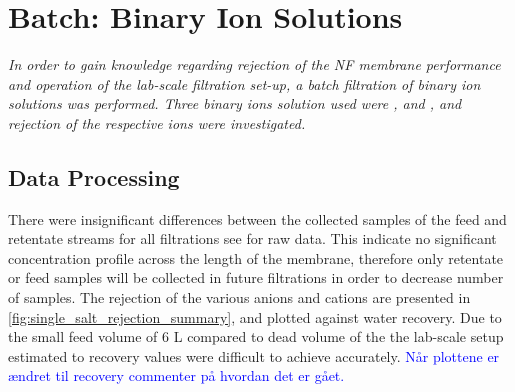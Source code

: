 \chapter{Batch: Binary Ion Solutions}
\label{Kapitel_batch_single_salt}

\textit{In order to gain knowledge regarding rejection of the NF membrane performance and operation of the lab-scale filtration set-up, a batch filtration of binary ion solutions was performed. 
Three binary ions solution used were ,  and , and rejection of the respective ions  were investigated.}


\section{Data Processing}


There were insignificant differences between the
collected samples of the feed and retentate streams for all filtrations see  for raw data. This indicate no significant concentration profile across the length of the membrane, therefore only retentate or feed samples will be collected in future filtrations in order to decrease number of samples. 
The rejection of the various anions and cations are presented in \cref{fig:single_salt_rejection_summary}, and plotted against water recovery. 
Due to the small feed volume of 6 L compared to dead volume of the the lab-scale setup estimated to  recovery values were difficult to achieve accurately. 
\textcolor{blue}{Når plottene er ændret til recovery commenter på hvordan det er gået. }


